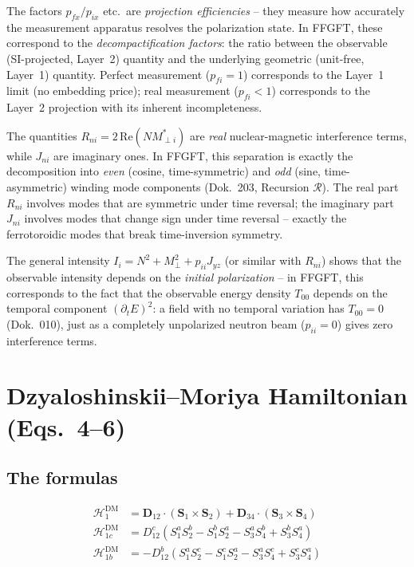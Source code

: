 The factors $p_{fx}/p_{ix}$ etc.\ are \emph{projection efficiencies} -- they
measure how accurately the measurement apparatus resolves the polarization
state. In FFGFT, these correspond to the \emph{decompactification factors}:
the ratio between the observable (SI-projected, Layer~2) quantity and the
underlying geometric (unit-free, Layer~1) quantity. Perfect measurement
($p_{fi} = 1$) corresponds to the Layer~1 limit (no embedding price); real
measurement ($p_{fi} < 1$) corresponds to the Layer~2 projection with its
inherent incompleteness.

The quantities $R_{ni} = 2\,\mathrm{Re}(NM_{\perp i}^*)$ are
\emph{real} nuclear-magnetic interference terms, while $J_{ni}$ are imaginary
ones. In FFGFT, this separation is exactly the decomposition into
\emph{even} (cosine, time-symmetric) and \emph{odd} (sine, time-asymmetric)
winding mode components (Dok.~203, Recursion $\mathcal{R}$). The real
part $R_{ni}$ involves modes that are symmetric under time reversal; the
imaginary part $J_{ni}$ involves modes that change sign under time reversal
-- exactly the ferrotoroidic modes that break time-inversion symmetry.

The general intensity $I_i = N^2 + M_\perp^2 + p_{ii} J_{yz}$ (or similar
with $R_{ni}$) shows that the observable intensity depends on the
\emph{initial polarization} -- in FFGFT, this corresponds to the fact that
the observable energy density $T_{00}$ depends on the temporal component
$(\partial_t E)^2$: a field with no temporal variation has $T_{00}=0$
(Dok.~010), just as a completely unpolarized neutron beam ($p_{ii}=0$) gives
zero interference terms.

\section{Dzyaloshinskii--Moriya Hamiltonian (Eqs.~4--6)}

\subsection*{The formulas}

\begin{align}
  \mathcal{H}_1^{\mathrm{DM}} &= \mathbf{D}_{12}\cdot(\mathbf{S}_1\times\mathbf{S}_2)
    + \mathbf{D}_{34}\cdot(\mathbf{S}_3\times\mathbf{S}_4)
  \tag{Paper~Eq.~4} \\[6pt]
  \mathcal{H}_{1c}^{\mathrm{DM}} &= D_{12}^c
    (S_1^a S_2^b - S_1^b S_2^a - S_3^a S_4^b + S_3^b S_4^a)
  \tag{Paper~Eq.~5} \\[6pt]
  \mathcal{H}_{1b}^{\mathrm{DM}} &= -D_{12}^b
    (S_1^a S_2^c - S_1^c S_2^a - S_3^a S_4^c + S_3^c S_4^a)
  \tag{Paper~Eq.~6}
\end{align}

